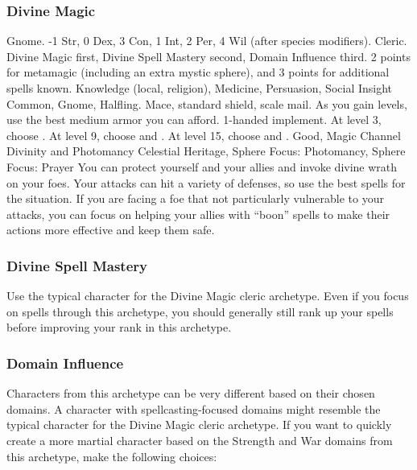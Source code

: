         \subsubsection{Divine Magic}
             Gnome.
             -1 Str, 0 Dex, 3 Con, 1 Int, 2 Per, 4 Wil (after species modifiers).
             Cleric.
             Divine Magic first, Divine Spell Mastery second, Domain Influence third.
             2 points for metamagic (including an extra mystic sphere), and 3 points for additional spells known.
             Knowledge (local, religion), Medicine, Persuasion, Social Insight
             Common, Gnome, Halfling.
             Mace, standard shield, scale mail. As you gain levels, use the best medium armor you can afford.
             1-handed implement.
                At level 3, choose .
                At level 9, choose  and .
                At level 15, choose  and .
             Good, Magic
             Channel Divinity and Photomancy
             Celestial Heritage, Sphere Focus: Photomancy, Sphere Focus: Prayer
             You can protect yourself and your allies and invoke divine wrath on your foes.
            Your attacks can hit a variety of defenses, so use the best spells for the situation.
            If you are facing a foe that not particularly vulnerable to your attacks, you can focus on helping your allies with ``boon'' spells to make their actions more effective and keep them safe.

        \subsubsection{Divine Spell Mastery}
            Use the typical character for the Divine Magic cleric archetype.
            Even if you focus on spells through this archetype, you should generally still rank up your spells before improving your rank in this archetype.

        \subsubsection{Domain Influence}
            Characters from this archetype can be very different based on their chosen domains.
            A character with spellcasting-focused domains might resemble the typical character for the Divine Magic cleric archetype.
            If you want to quickly create a more martial character based on the Strength and War domains from this archetype, make the following choices:


